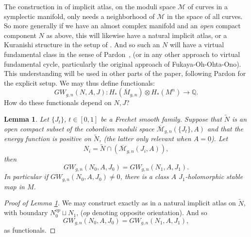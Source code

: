 \documentclass{amsart}
\numberwithin{equation}{section}
\newtheorem{lemma}[equation]{Lemma}
\theoremstyle{definition}
\theoremstyle{remark}
\DeclareMathOperator {\energy} {energy}
\begin{document}
 The construction in \cite{citePardonAlgebraicApproach} of implicit atlas,  on the moduli space $\mathcal{M}$  of curves in a symplectic manifold, only needs a neighborhood of $\mathcal{M}$ in the space of all curves. So more generally if we have an almost complex manifold and an \emph{open} compact component $N$ as above,  this will likewise have a natural implicit atlas, or a Kuranishi structure in the setup of \cite{citeFukayaOnoArnoldandGW}.  And so such an $N$ will have
  a virtual fundamental class in the sense of Pardon~\cite{citePardonAlgebraicApproach}, (or in any other approach to virtual fundamental cycle, particularly the original approach of Fukaya-Oh-Ohta-Ono).
  This understanding will be used in other parts of the paper, following  Pardon for the explicit setup. 
We may thus define functionals:
\begin{equation} \label{eq:functionals2}
GW _{g,n}  (N,A,J): H_* (\overline{M} _{g,n}) \otimes H _{*} (M ^{n} )  \to
   \mathbb{Q}.
\end{equation}
How do these functionals depend on $N,J$? 
\begin{lemma} \label{prop:invariance1} Let $\{J _{t} \}$, $t \in [0,1]$ be a Frechet smooth family. Suppose that $\widetilde{N}$ is an open compact subset of the cobordism moduli
space $\overline{\mathcal{M}} _{g,n}   (\{J _{t} \},
A)
$ and that the energy function is positive on $\widetilde{N} $, (the latter only relevant when $A=0$).
   Let $$N _{i} = \widetilde{N} \cap \left( \overline{\mathcal{M}} _{g,n}   (J _{i}, A)\right),  $$  then $$GW _{g,n}  (N _{0}, A, J _{0} ) = GW _{g,n} (N _{1}, A,
 J _{1}).  $$ In particular if $GW _{g,n}  (N _{0}, A,  J _{0} )
   \neq 0$, there is a class $A$ $J _{1} $-holomorphic stable map in $M$.
\end{lemma} 
\begin{proof} [Proof of Lemma \ref{prop:invariance1}]
   We may construct exactly as in \cite{citePardonAlgebraicApproach} a natural implicit atlas on $\widetilde{N} $, with boundary $N _{0}  ^{op} \sqcup  N _{1} $, ($op$ denoting opposite orientation). And so 
   \begin{equation*}
   GW _{g,n}   (N  _{0}, A, J _{0} ) = GW _{g,n}    (N _{1}, A, J _{1} ), 
\end{equation*}
as functionals.
\end{proof}
\end{document}
